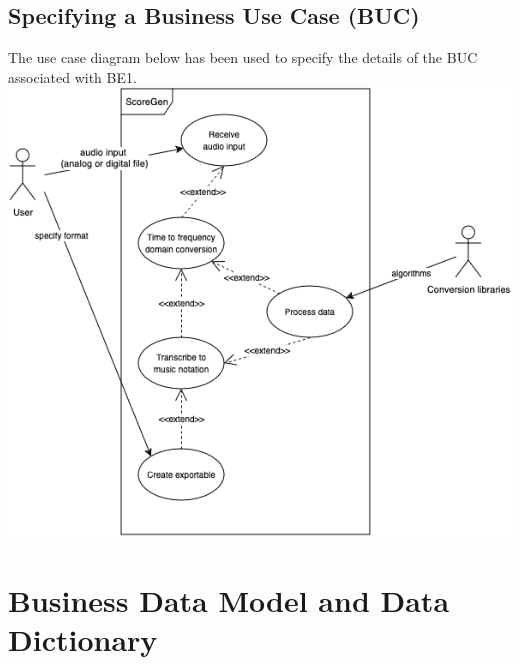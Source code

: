 \documentclass[12pt]{article}
\begin{document}
\subsection{Specifying a Business Use Case (BUC)}
The use case diagram below has been used to specify the details of the BUC 
associated with BE1.\\
\includegraphics[width=\textwidth]{BUC-revised.png}

\section{Business Data Model and Data Dictionary}
\end{document}
